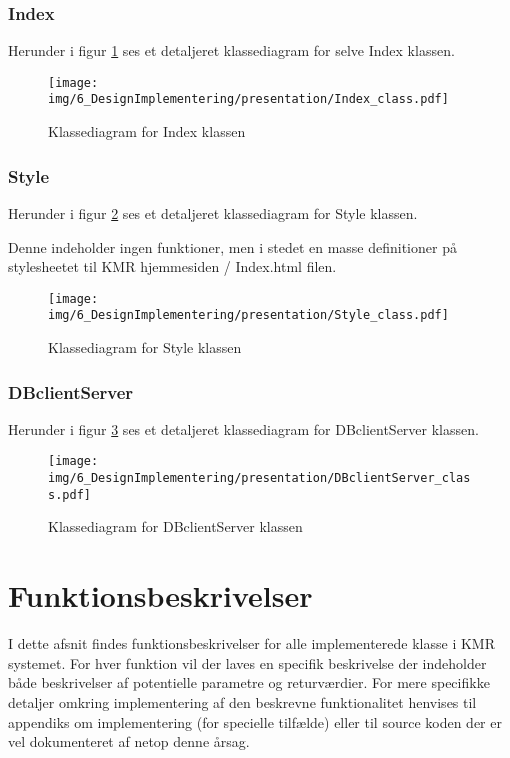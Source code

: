 \begin{appendices}
\subsection{Index}

Herunder i figur \ref{fig:Index_class} ses et detaljeret klassediagram for selve Index klassen.
\begin{figure}[H]
	\centering
	\texttt{[image: img/6\_DesignImplementering/presentation/Index\_class.pdf]}
	\caption{Klassediagram for Index klassen}
	\label{fig:Index_class}
\end{figure}
\pagebreak

\subsection{Style}

Herunder i figur \ref{fig:Style_class} ses et detaljeret klassediagram for Style klassen.

Denne indeholder ingen funktioner, men i stedet en masse definitioner på stylesheetet til KMR hjemmesiden / Index.html filen.

\begin{figure}[H]
	\centering
	\texttt{[image: img/6\_DesignImplementering/presentation/Style\_class.pdf]}
	\caption{Klassediagram for Style klassen}
	\label{fig:Style_class}
\end{figure}
\pagebreak

\subsection{DBclientServer}

Herunder i figur \ref{fig:DBclientServer_class} ses et detaljeret klassediagram for DBclientServer klassen.
\begin{figure}[H]
	\centering
	\texttt{[image: img/6\_DesignImplementering/presentation/DBclientServer\_class.pdf]}
	\caption{Klassediagram for DBclientServer klassen}
	\label{fig:DBclientServer_class}
\end{figure}
\pagebreak

\chapter{Funktionsbeskrivelser} \label{appendix::funktionsbeskrivelser}

I dette afsnit findes funktionsbeskrivelser for alle implementerede klasse i KMR systemet. For hver funktion vil der laves en specifik beskrivelse der indeholder både beskrivelser af potentielle parametre og returværdier. For mere specifikke detaljer omkring implementering af den beskrevne funktionalitet henvises til appendiks om implementering (for specielle tilfælde) eller til source koden der er vel dokumenteret af netop denne årsag.  


\end{appendices}
